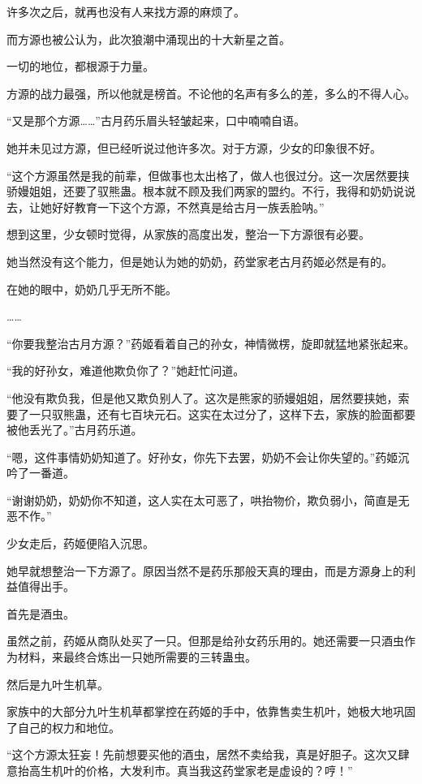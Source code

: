 \begin{this_body}
许多次之后，就再也没有人来找方源的麻烦了。

而方源也被公认为，此次狼潮中涌现出的十大新星之首。

一切的地位，都根源于力量。

方源的战力最强，所以他就是榜首。不论他的名声有多么的差，多么的不得人心。

“又是那个方源……”古月药乐眉头轻皱起来，口中喃喃自语。

她并未见过方源，但已经听说过他许多次。对于方源，少女的印象很不好。

“这个方源虽然是我的前辈，但做事也太出格了，做人也很过分。这一次居然要挟骄嫚姐姐，还要了驭熊蛊。根本就不顾及我们两家的盟约。不行，我得和奶奶说说去，让她好好教育一下这个方源，不然真是给古月一族丢脸呐。”

想到这里，少女顿时觉得，从家族的高度出发，整治一下方源很有必要。

她当然没有这个能力，但是她认为她的奶奶，药堂家老古月药姬必然是有的。

在她的眼中，奶奶几乎无所不能。

……

“你要我整治古月方源？”药姬看着自己的孙女，神情微楞，旋即就猛地紧张起来。

“我的好孙女，难道他欺负你了？”她赶忙问道。

“他没有欺负我，但是他又欺负别人了。这次是熊家的骄嫚姐姐，居然要挟她，索要了一只驭熊蛊，还有七百块元石。这实在太过分了，这样下去，家族的脸面都要被他丢光了。”古月药乐道。

“嗯，这件事情奶奶知道了。好孙女，你先下去罢，奶奶不会让你失望的。”药姬沉吟了一番道。

“谢谢奶奶，奶奶你不知道，这人实在太可恶了，哄抬物价，欺负弱小，简直是无恶不作。”

少女走后，药姬便陷入沉思。

她早就想整治一下方源了。原因当然不是药乐那般天真的理由，而是方源身上的利益值得出手。

首先是酒虫。

虽然之前，药姬从商队处买了一只。但那是给孙女药乐用的。她还需要一只酒虫作为材料，来最终合炼出一只她所需要的三转蛊虫。

然后是九叶生机草。

家族中的大部分九叶生机草都掌控在药姬的手中，依靠售卖生机叶，她极大地巩固了自己的权力和地位。

“这个方源太狂妄！先前想要买他的酒虫，居然不卖给我，真是好胆子。这次又肆意抬高生机叶的价格，大发利市。真当我这药堂家老是虚设的？哼！”

\end{this_body}

